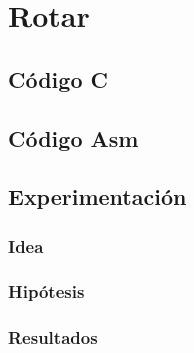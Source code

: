 \section{Rotar}

\subsection{Código C}
	
\subsection{Código Asm}
	
	
	
\subsection{Experimentación}
\subsubsection{Idea}	

\subsubsection{Hipótesis}
	
	
\subsubsection{Resultados}
	